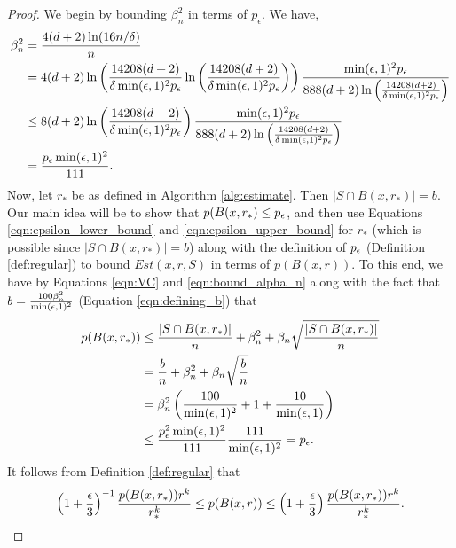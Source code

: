 \begin{proof}
We begin by bounding $\beta_n^2$ in terms of $p_\epsilon$. We have, 
\begin{equation}\label{eqn:bound_alpha_n}
\begin{split}
\beta_n^2 &= \frac{4(d+2)\ln(16n/\delta)}{n} \\
&= 4(d+2) \ln \left(\frac{14208(d+2)}{\delta \min(\epsilon,1)^2 p_\epsilon}\ln\left(\frac{14208(d+2)}{\delta \min(\epsilon,1)^2 p_\epsilon} \right)\right) \frac{\min(\epsilon,1)^2 p_\epsilon}{888(d+2)\ln \left(\frac{14208(d+2)}{\delta \min(\epsilon,1)^2 p_\epsilon} \right)} \\
&\leq 8(d+2)\ln \left(\frac{14208(d+2)}{\delta \min(\epsilon,1)^2 p_\epsilon}\right) \frac{\min(\epsilon, 1)^2 p_\epsilon}{888(d+2)\ln \left(\frac{14208(d+2)}{\delta \min(\epsilon,1)^2 p_\epsilon} \right)} \\
&= \frac{p_\epsilon \min(\epsilon, 1)^2}{111}.
\end{split}
\end{equation}
Now, let $r_*$ be as defined in Algorithm \ref{alg:estimate}. Then $|S \cap B(x, r_*)| = b$. Our main idea will be to show that $p(B(x, r_*) \leq p_\epsilon$, and then use Equations \ref{eqn:epsilon_lower_bound} and \ref{eqn:epsilon_upper_bound} for $r_*$ (which is possible since $|S \cap B(x, r_*)| = b$) along with the definition of $p_\epsilon$ (Definition \ref{def:regular}) to bound $Est(x, r, S)$ in terms of $p(B(x, r))$. To this end, we have by Equations \ref{eqn:VC} and \ref{eqn:bound_alpha_n} along with the fact that $b = \frac{100\beta_n^2}{\min(\epsilon, 1)^2}$ (Equation \ref{eqn:defining_b}) that 
\begin{equation*}
\begin{split}
p(B(x, r_*)) &\leq \frac{|S \cap B(x, r_*)|}{n} + \beta_n^2 + \beta_n \sqrt{\frac{|S \cap B(x, r_*)|}{n}} \\
&= \frac{b}{n} + \beta_n^2 + \beta_n\sqrt{\frac{b}{n}} \\
&= \beta_n^2\left(\frac{100}{\min(\epsilon,1)^2} +1 + \frac{10}{\min(\epsilon,1)}\right) \\
&\leq \frac{p_\epsilon^2 \min(\epsilon, 1)^2}{111}\frac{111}{\min(\epsilon, 1)^2}  = p_\epsilon.
\end{split}
\end{equation*}
It follows from Definition \ref{def:regular} that 
\begin{equation}\label{eqn:using_regular}
\left(1 + \frac{\epsilon}{3}\right)^{-1}\frac{p(B(x, r_*))r^k}{r_*^k} \leq p(B(x, r)) \leq \left(1 + \frac{\epsilon}{3}\right)\frac{p(B(x, r_*))r^k}{r_*^k}.\end{equation} 

\end{proof}
